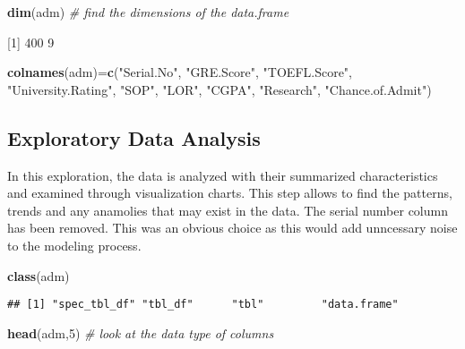 \documentclass[11pt,]{article}
\newenvironment{Shaded}{\begin{snugshade}}{\end{snugshade}}
\newcommand{\CommentTok}[1]{\textcolor[rgb]{0.56,0.35,0.01}{\textit{#1}}}
\newcommand{\DecValTok}[1]{\textcolor[rgb]{0.00,0.00,0.81}{#1}}
\newcommand{\KeywordTok}[1]{\textcolor[rgb]{0.13,0.29,0.53}{\textbf{#1}}}
\newcommand{\NormalTok}[1]{#1}
\newcommand{\StringTok}[1]{\textcolor[rgb]{0.31,0.60,0.02}{#1}}
\begin{document}
\begin{Shaded}
\begin{Highlighting}[]
\KeywordTok{dim}\NormalTok{(adm) }\CommentTok{# find the dimensions of the data.frame}
\end{Highlighting}
\end{Shaded}

{[}1{]} 400 9

\begin{Shaded}
\begin{Highlighting}[]
\KeywordTok{colnames}\NormalTok{(adm)=}\KeywordTok{c}\NormalTok{(}\StringTok{"Serial.No"}\NormalTok{, }\StringTok{"GRE.Score"}\NormalTok{, }\StringTok{"TOEFL.Score"}\NormalTok{, }\StringTok{"University.Rating"}\NormalTok{, }
                \StringTok{"SOP"}\NormalTok{, }\StringTok{"LOR"}\NormalTok{, }\StringTok{"CGPA"}\NormalTok{, }\StringTok{"Research"}\NormalTok{, }\StringTok{"Chance.of.Admit"}\NormalTok{)}
\end{Highlighting}
\end{Shaded}

\hypertarget{exploratory-data-analysis}{%
\subsection{Exploratory Data Analysis}\label{exploratory-data-analysis}}

In this exploration, the data is analyzed with their summarized
characteristics and examined through visualization charts. This step
allows to find the patterns, trends and any anamolies that may exist in
the data. The serial number column has been removed. This was an obvious
choice as this would add unncessary noise to the modeling process.

\begin{Shaded}
\begin{Highlighting}[]
\KeywordTok{class}\NormalTok{(adm)}
\end{Highlighting}
\end{Shaded}

\begin{verbatim}
## [1] "spec_tbl_df" "tbl_df"      "tbl"         "data.frame"
\end{verbatim}

\begin{Shaded}
\begin{Highlighting}[]
\KeywordTok{head}\NormalTok{(adm,}\DecValTok{5}\NormalTok{) }\CommentTok{# look at the data type of columns}
\end{Highlighting}
\end{Shaded}
\end{document}
